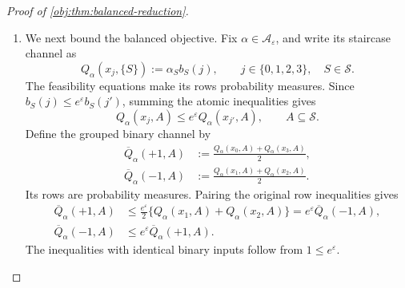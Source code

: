 \documentclass[11pt]{article}
\begin{document}
\begin{proof}[Proof of \cref{obj:thm:balanced-reduction}]
\begin{enumerate}
The contributions from \(S=\{0\}\) and \(S=\{3\}\) satisfy
\[
\begin{aligned}
0\le
\frac{(e^\varepsilon-1)^2t_{\mathrm{sing}}^2}
{4(e^\varepsilon+3)h_{\{0\}}(\theta)}
&\le F_\theta(\alpha^{\mathrm{sing}},t_{\mathrm{sing}}),\\
0\le
\frac{(e^\varepsilon-1)^2(t_{\mathrm{sing}}+1)^2}
{4(e^\varepsilon+3)h_{\{3\}}(\theta)}
&\le F_\theta(\alpha^{\mathrm{sing}},t_{\mathrm{sing}}).
\end{aligned}
\]
Both coefficients are strictly positive. A zero minimum would therefore
force \(t_{\mathrm{sing}}=0\) and \(t_{\mathrm{sing}}+1=0\), a contradiction.
By the definition of \(J^*\),
\[
0<
\min_{t\in\mathbb R}F_\theta(\alpha^{\mathrm{sing}},t)
\le J^*(\theta,1/2,\varepsilon).
\]

\item We next bound the balanced objective. Fix
\(\alpha\in\mathcal A_\varepsilon\), and write its staircase channel as
\[
Q_\alpha(x_j,\{S\})
:=\alpha_S b_S(j),
\qquad j\in\{0,1,2,3\},\quad S\in\mathcal S.
\]
The feasibility equations make its rows probability measures. Since
\(b_S(j)\le e^\varepsilon b_S(j')\), summing the atomic inequalities gives
\[
Q_\alpha(x_j,A)
\le e^\varepsilon Q_\alpha(x_{j'},A),
\qquad A\subseteq\mathcal S.
\]
Define the grouped binary channel by
\[
\begin{aligned}
\overline Q_\alpha(+1,A)
&:=\frac{Q_\alpha(x_0,A)+Q_\alpha(x_3,A)}2,\\
\overline Q_\alpha(-1,A)
&:=\frac{Q_\alpha(x_1,A)+Q_\alpha(x_2,A)}2.
\end{aligned}
\]
Its rows are probability measures. Pairing the original row inequalities
gives
\[
\begin{aligned}
\overline Q_\alpha(+1,A)
&\le \frac{e^\varepsilon}{2}
\{Q_\alpha(x_1,A)+Q_\alpha(x_2,A)\}
=e^\varepsilon\overline Q_\alpha(-1,A),\\
\overline Q_\alpha(-1,A)
&\le e^\varepsilon\overline Q_\alpha(+1,A).
\end{aligned}
\]
The inequalities with identical binary inputs follow from
\(1\le e^\varepsilon\).


\end{enumerate}
\end{proof}
\end{document}
